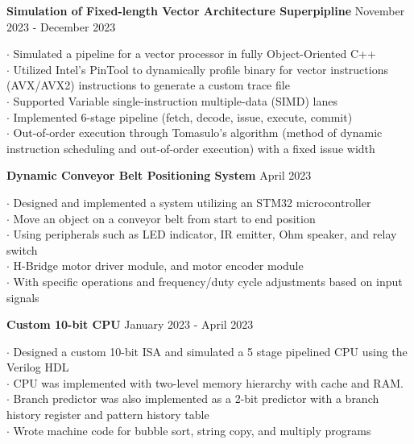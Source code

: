 \documentclass[letter,12pt]{article}
\begin{document}
\vspace{-.125cm}
\begin{tcolorbox}
[colback=gray!25,
  leftrule=0pt,
  rightrule=0pt,
  sharp corners]
\noindent\textbf{Simulation of Fixed-length Vector Architecture Superpipline}
\hfill November 2023 - December 2023
\end{tcolorbox}
\noindent
$\cdot$ Simulated a pipeline for a vector processor in fully Object-Oriented C++\\
$\cdot$ Utilized Intel's PinTool to dynamically profile binary for vector instructions (AVX/AVX2) instructions to generate a custom trace file\\
$\cdot$ Supported Variable single-instruction multiple-data (SIMD) lanes\\
$\cdot$ Implemented 6-stage pipeline (fetch, decode, issue, execute, commit)\\
$\cdot$ Out-of-order execution through Tomasulo's algorithm (method of dynamic
instruction scheduling and out-of-order execution)
with a fixed issue width\\

\vspace{-.5cm}
\begin{tcolorbox}
[colback=gray!25,
  leftrule=0pt,
  rightrule=0pt,
  sharp corners]
\noindent\textbf{Dynamic Conveyor Belt Positioning System} 
  \hfill April 2023 
\end{tcolorbox}
\noindent
$\cdot$ Designed and implemented a system utilizing an STM32 microcontroller \\
$\cdot$ Move an object on a conveyor belt from start to end position \\
$\cdot$ Using peripherals such as LED indicator, IR emitter, Ohm speaker, and relay switch\\
$\cdot$ H-Bridge motor driver module, and motor encoder module \\
$\cdot$ With specific operations and frequency/duty cycle adjustments based on input signals \\

\vspace{-.5cm}

\begin{tcolorbox}
[colback=gray!25,
  leftrule=0pt,
  rightrule=0pt,
  sharp corners]
\textbf{Custom 10-bit CPU} 
\hfill January 2023 - April 2023 
\end{tcolorbox}
\noindent
$\cdot$ Designed a custom 10-bit ISA and simulated a 5 stage pipelined CPU using the Verilog HDL \\
$\cdot$ CPU was implemented with two-level memory hierarchy with cache and RAM. \\
$\cdot$ Branch predictor was also implemented as a 2-bit predictor with a branch history register and
pattern history table\\
$\cdot$ Wrote machine code for bubble sort, string copy, and multiply programs
\vspace{-.75cm}
\end{document}
